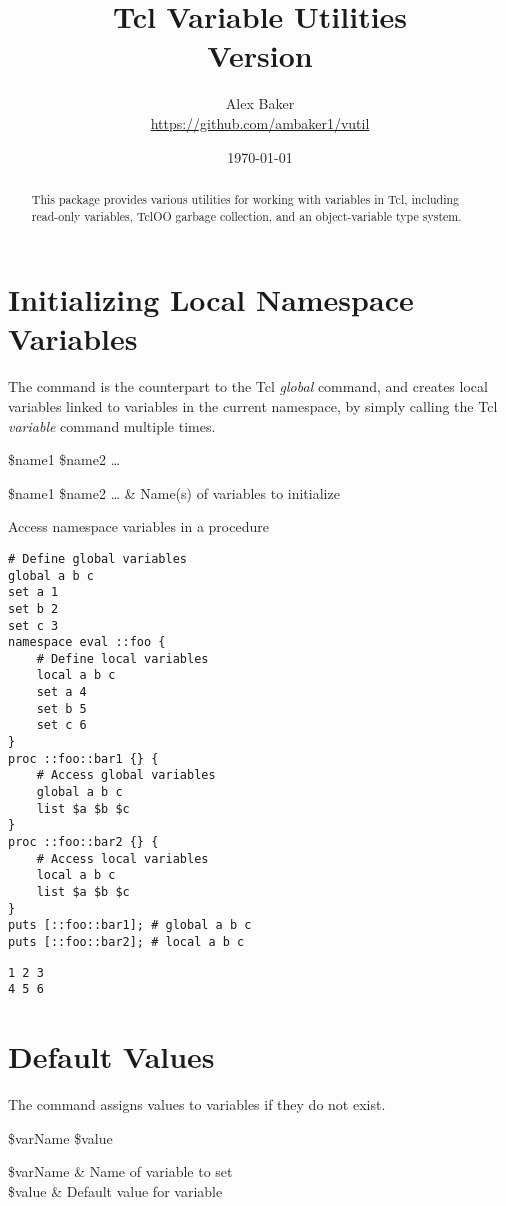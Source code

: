 \documentclass{article}
\title{\Huge Tcl Variable Utilities\\\small Version \version}
\author{Alex Baker\\\small\url{https://github.com/ambaker1/vutil}}
\date{\small\today}
\begin{document}
\maketitle
\begin{abstract}
\begin{center}
This package provides various utilities for working with variables in Tcl, including read-only variables, TclOO garbage collection, and an object-variable type system.
\end{center}
\end{abstract}
\clearpage
\section{Initializing Local Namespace Variables}
The command  is the counterpart to the Tcl \textit{global} command, and creates local variables linked to variables in the current namespace, by simply calling the Tcl \textit{variable} command multiple times.
\begin{syntax}
 \$name1 \$name2 …
\end{syntax}
\begin{args}
\$name1 \$name2 … & Name(s) of variables to initialize
\end{args}
\begin{example}{Access namespace variables in a procedure}
\begin{lstlisting}
# Define global variables
global a b c
set a 1
set b 2
set c 3
namespace eval ::foo {
    # Define local variables
    local a b c
    set a 4
    set b 5
    set c 6
}
proc ::foo::bar1 {} {
    # Access global variables
    global a b c
    list $a $b $c
}
proc ::foo::bar2 {} {
    # Access local variables
    local a b c
    list $a $b $c
}
puts [::foo::bar1]; # global a b c
puts [::foo::bar2]; # local a b c
\end{lstlisting}
\tcblower
\begin{lstlisting}
1 2 3
4 5 6
\end{lstlisting}
\end{example}

\clearpage

\section{Default Values}
The command  assigns values to variables if they do not exist. 

\begin{syntax}
 \$varName \$value
\end{syntax}
\begin{args}
\$varName & Name of variable to set \\
\$value & Default value for variable
\end{args}
\end{document}
